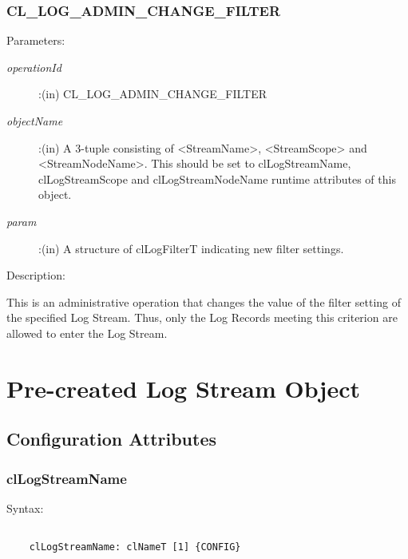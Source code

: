 \begin{flushleft}
\subsubsection{CL\_\-LOG\_\-ADMIN\_\-CHANGE\_\-FILTER}
\begin{Desc}
\item[Parameters:] 
\begin{description}
\item[{\em operationId}]:(in) CL\_\-LOG\_\-ADMIN\_\-CHANGE\_\-FILTER
\item[{\em objectName}]:(in) A 3-tuple consisting of <StreamName>, <StreamScope> and <StreamNodeName>. This should be set to clLogStreamName, 
clLogStreamScope and clLogStreamNodeName runtime attributes of this object.
\item[{\em param}]:(in) A structure of clLogFilterT indicating new filter settings.
\end{description}
\end{Desc}
\begin{Desc}
 \item[Description:]
\end{Desc}
This is an administrative operation that changes the value of the filter setting of the specified Log Stream. Thus, only the Log Records 
meeting this criterion are allowed to enter the Log Stream.




\section{Pre-created Log Stream Object}
\subsection{Configuration Attributes}


\subsubsection{clLogStreamName}
\begin{Desc}
\item[Syntax:]
\footnotesize\begin{verbatim}        	

	clLogStreamName: clNameT [1] {CONFIG}
	\end{verbatim}
	\normalsize
\end{Desc}


\end{flushleft}
